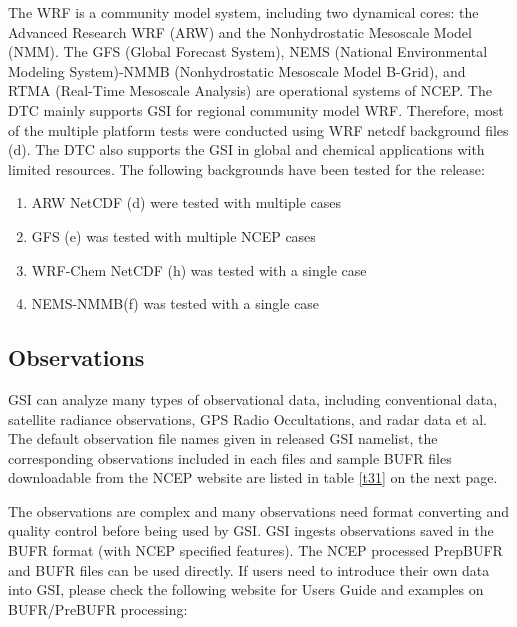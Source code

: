 The WRF is a community model system, including two dynamical cores: the Advanced Research WRF (ARW) and the Nonhydrostatic Mesoscale Model (NMM). The GFS (Global Forecast System), NEMS (National Environmental Modeling System)-NMMB (Nonhydrostatic Mesoscale Model B-Grid), and RTMA (Real-Time Mesoscale Analysis) are operational systems of NCEP. The DTC mainly supports GSI for regional community model WRF. Therefore, most of the multiple platform tests were conducted using WRF netcdf background files (d). The DTC also supports the GSI in global and chemical applications with limited resources. The following backgrounds have been tested for the release:

\begin{small}
\begin{enumerate}
\item  ARW NetCDF (d) were tested with multiple cases
\item GFS (e) was tested with multiple NCEP cases
\item WRF-Chem NetCDF (h) was tested with a single case
\item NEMS-NMMB(f) was tested with a single case
\end{enumerate}
\end{small}


\subsection{Observations}

GSI can analyze many types of observational data, including conventional data, satellite radiance observations, GPS Radio Occultations, and radar data et al. The default observation file names given in released GSI namelist, the corresponding observations included in each files and sample BUFR files downloadable from the NCEP website are listed in table \ref{t31} on the next page. 

The observations are complex and many observations need format converting and quality control before being used by GSI. GSI ingests observations saved in the BUFR format (with NCEP specified features). The NCEP processed PrepBUFR and BUFR files can be used directly. If users need to introduce their own data into GSI, please check the following website for User\textquotesingle s Guide and examples on BUFR/PreBUFR processing: 


